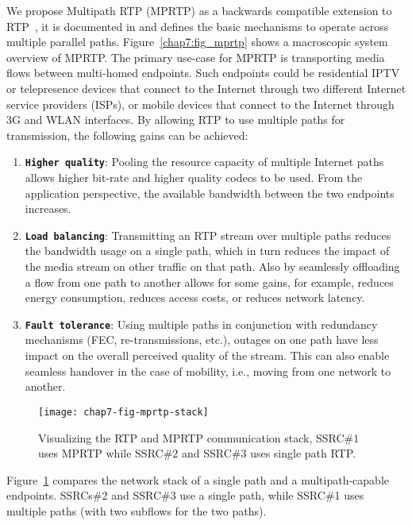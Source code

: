 We propose Multipath RTP (MPRTP) as a backwards compatible extension to
RTP~\cite{rfc3550}, it is documented in \cite{draft.mprtp} and defines the
basic mechanisms to operate across multiple parallel paths.
Figure~\ref{chap7:fig_mprtp} shows a macroscopic system overview of MPRTP. The
primary use-case for MPRTP is transporting media flows between multi-homed
endpoints. Such endpoints could be residential IPTV or telepresence devices
that connect to the Internet through two different Internet service providers
(ISPs), or mobile devices that connect to the Internet through 3G and WLAN
interfaces. By allowing RTP to use multiple paths for transmission, the
following gains can be achieved:

\begin{enumerate}
\setlength{\itemsep}{5pt}

\item \textbf{\texttt{Higher quality}}: Pooling the resource capacity of
multiple Internet paths allows higher bit-rate and higher quality codecs to be
used. From the application perspective, the available bandwidth between the
two endpoints increases.

\item \textbf{\texttt{Load balancing}}: Transmitting an RTP stream over
multiple paths reduces the bandwidth usage on a single path, which in turn
reduces the impact of the media stream on other traffic on that path. Also by
seamlessly offloading a flow from one path to another allows for some gains,
for example, reduces energy consumption, reduces access costs, or reduces
network latency.

\item \textbf{\texttt{Fault tolerance}}: Using multiple paths in conjunction
with redundancy mechanisms (FEC, re-transmissions, etc.), outages on one path
have less impact on the overall perceived quality of the stream. This can also
enable seamless handover in the case of mobility, i.e., moving from one
network to another.

\end{enumerate}


\begin{figure}
\centerline {
\texttt{[image: chap7-fig-mprtp-stack]}
}
\caption{Visualizing the RTP and MPRTP communication stack, SSRC$\#1$ uses
MPRTP while SSRC$\#2$ and SSRC$\#3$ uses single path RTP.}
\label{chap7:fig_mprtp_arch}
\end{figure}

Figure~\ref{chap7:fig_mprtp_arch} compares the network stack of a single path
and a multipath-capable endpoints. SSRCs\#2 and SSRC\#3 use a single path,
while SSRC\#1 uses multiple paths (with two subflows for the two paths).

